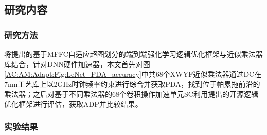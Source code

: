 \subsection{研究内容}

\subsubsection{研究方法}

将提出的基于MFFC自适应超图划分的端到端强化学习逻辑优化框架与近似乘法器库结合，针对DNN硬件加速器，本文首先对图\ref{AC:AM:Adapt:Fig:LeNet_PDA_accuracy}中共68个XWYF近似乘法器通过DC在7nm工艺库\cite{ASAP7_github}上以2GHz时钟频率约束进行综合并获取PDA，找到位于帕累拖前沿的乘法器；之后对基于不同乘法器的68个卷积操作加速单元SC\cite{Accelerator:SC}利用提出的开源逻辑优化框架进行评估，获取ADP并比较结果。


\subsubsection{实验结果}

